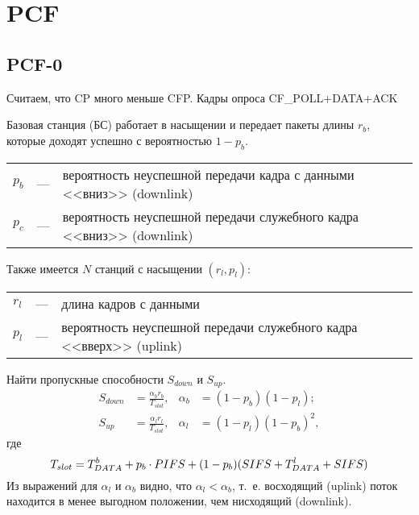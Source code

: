 \section{PCF}
\renewcommand{\ll}[1]{\lambda^{l}_{#1}}
\newcommand{\rl}[1]{r^{l}_{#1}}
\newcommand{\lb}[1]{\lambda^{b}_{#1}}
\newcommand{\rb}[1]{r^{b}_{#1}}
\newcommand{\tb}[1]{\overline{t_{#1 b}}}
\newcommand{\tl}[1]{\overline{t_{#1 l}}}
\newcommand{\Tdb}[1]{T_{DATA}^{#1,b}}
\newcommand{\Tdl}[1]{T_{DATA}^{#1,l}}

\subsection{PCF-0}
Считаем, что CP много меньше CFP.
Кадры опроса CF\_POLL{+DATA{+ACK}}

Базовая станция (БС) работает в насыщении и передает пакеты длины $r_b$, которые доходят успешно с вероятностью $1-p_b$.

\begin{tabular}{l l l}
$p_{b}$ 	&---	&вероятность неуспешной передачи кадра с данными <<вниз>>  (downlink) \\
$p_{c}$		&---	&вероятность неуспешной передачи служебного кадра <<вниз>> (downlink)   \\
\end{tabular}

Также имеется $N$ станций с насыщении $(r_l, p_l)$:

\begin{tabular}{l l l}
$r_{l}$ 	&---	&длина кадров с данными \\
$p_{l}$		&---	&вероятность неуспешной передачи служебного кадра <<вверх>> (uplink)   \\
\end{tabular}

Найти пропускные способности $S_{down}$ и $S_{up}$.
\begin{align*}
S_{down} &= \frac{\alpha_b r_b}{T_{slot}},  & \alpha_b &= (1-p_b)(1-p_l); \\
S_{up} &= \frac{\alpha_l r_l}{T_{slot}},  & \alpha_l &= (1-p_l)(1-p_b)^2,
\end{align*}
где 
\begin{equation}
\notag
T_{slot} = T_{DATA}^b + p_b \cdot PIFS + (1-p_b)(SIFS + T_{DATA}^l + SIFS)
\end{equation}
Из выражений для $\alpha_l$ и $\alpha_b$ видно, что $\alpha_l < \alpha_b$, т.~е. восходящий (uplink) поток находится в менее выгодном положении, чем нисходящий (downlink).

